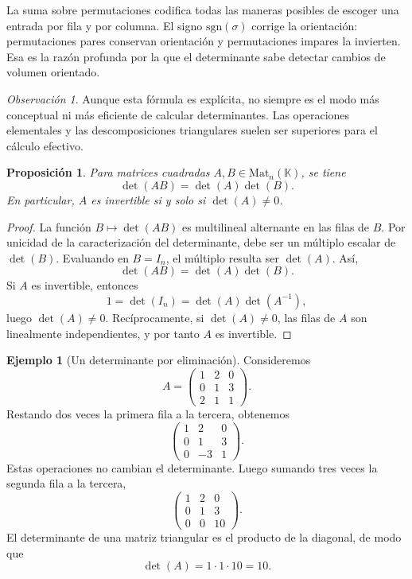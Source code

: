 \documentclass[10pt,a4paper,oneside]{article}
\theoremstyle{plain}
\newtheorem{proposition}[theorem]{Proposición}
\theoremstyle{definition}
\newtheorem{example}[theorem]{Ejemplo}
\theoremstyle{remark}
\newtheorem{remark}[theorem]{Observación}
\newcommand{\K}{\mathbb{K}}
\newcommand{\Mat}{\mathrm{Mat}}
\begin{document}
\begin{intuitionBox}
La suma sobre permutaciones codifica todas las maneras posibles de escoger una entrada por fila y por columna. El signo \(\mathrm{sgn}(\sigma)\) corrige la orientación: permutaciones pares conservan orientación y permutaciones impares la invierten. Esa es la razón profunda por la que el determinante sabe detectar cambios de volumen orientado.
\end{intuitionBox}

\begin{remark}
Aunque esta fórmula es explícita, no siempre es el modo más conceptual ni más eficiente de calcular determinantes. Las operaciones elementales y las descomposiciones triangulares suelen ser superiores para el cálculo efectivo.
\end{remark}

\begin{proposition}
Para matrices cuadradas \(A,B\in\Mat_n(\K)\), se tiene
\[
\det(AB)=\det(A)\det(B).
\]
En particular, \(A\) es invertible si y solo si \(\det(A)\neq 0\).
\end{proposition}

\begin{proof}
La función \(B\mapsto \det(AB)\) es multilineal alternante en las filas de \(B\). Por unicidad de la caracterización del determinante, debe ser un múltiplo escalar de \(\det(B)\). Evaluando en \(B=I_n\), el múltiplo resulta ser \(\det(A)\). Así,
\[
\det(AB)=\det(A)\det(B).
\]
Si \(A\) es invertible, entonces
\[
1=\det(I_n)=\det(A)\det(A^{-1}),
\]
luego \(\det(A)\neq 0\). Recíprocamente, si \(\det(A)\neq 0\), las filas de \(A\) son linealmente independientes, y por tanto \(A\) es invertible. \end{proof}

\begin{example}[Un determinante por eliminación]
Consideremos
\[
A=
\begin{pmatrix}
1 & 2 & 0\\
0 & 1 & 3\\
2 & 1 & 1
\end{pmatrix}.
\]
Restando dos veces la primera fila a la tercera, obtenemos
\[
\begin{pmatrix}
1 & 2 & 0\\
0 & 1 & 3\\
0 & -3 & 1
\end{pmatrix}.
\]
Estas operaciones no cambian el determinante. Luego sumando tres veces la segunda fila a la tercera,
\[
\begin{pmatrix}
1 & 2 & 0\\
0 & 1 & 3\\
0 & 0 & 10
\end{pmatrix}.
\]
El determinante de una matriz triangular es el producto de la diagonal, de modo que
\[
\det(A)=1\cdot 1\cdot 10=10.
\]
\end{example}
\end{document}

